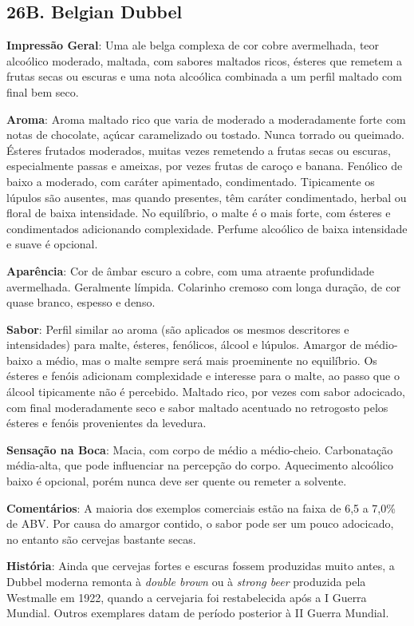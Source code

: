 \subsection*{26B. Belgian Dubbel}
\textbf{Impressão Geral}: Uma ale belga complexa de cor cobre avermelhada, teor alcoólico moderado, maltada, com sabores maltados ricos, ésteres que remetem a frutas secas ou escuras e uma nota alcoólica combinada a um perfil maltado com final bem seco.

\textbf{Aroma}: Aroma maltado rico que varia de moderado a moderadamente forte com notas de chocolate, açúcar caramelizado ou tostado. Nunca torrado ou queimado. Ésteres frutados moderados, muitas vezes remetendo a frutas secas ou escuras, especialmente passas e ameixas, por vezes frutas de caroço e banana. Fenólico de baixo a moderado, com caráter apimentado, condimentado. Tipicamente os lúpulos são ausentes, mas quando presentes, têm caráter condimentado, herbal ou floral de baixa intensidade. No equilíbrio, o malte é o mais forte, com ésteres e condimentados adicionando complexidade. Perfume alcoólico de baixa intensidade e suave é opcional.

\textbf{Aparência}: Cor de âmbar escuro a cobre, com uma atraente profundidade avermelhada. Geralmente límpida. Colarinho cremoso com longa duração, de cor quase branco, espesso e denso.

\textbf{Sabor}: Perfil similar ao aroma (são aplicados os mesmos descritores e intensidades) para malte, ésteres, fenólicos, álcool e lúpulos. Amargor de médio-baixo a médio, mas o malte sempre será mais proeminente no equilíbrio. Os ésteres e fenóis adicionam complexidade e interesse para o malte, ao passo que o álcool tipicamente não é percebido. Maltado rico, por vezes com sabor adocicado, com final moderadamente seco e sabor maltado acentuado no retrogosto pelos ésteres e fenóis provenientes da levedura.

\textbf{Sensação na Boca}: Macia, com corpo de médio a médio-cheio. Carbonatação média-alta, que pode influenciar na percepção do corpo. Aquecimento alcoólico baixo é opcional, porém nunca deve ser quente ou remeter a solvente.

\textbf{Comentários}: A maioria dos exemplos comerciais estão na faixa de 6,5 a 7,0\% de ABV. Por causa do amargor contido, o sabor pode ser um pouco adocicado, no entanto são cervejas bastante secas.

\textbf{História}: Ainda que cervejas fortes e escuras fossem produzidas muito antes, a Dubbel moderna remonta à \textit{double brown} ou à \textit{strong beer} produzida pela Westmalle em 1922, quando a cervejaria foi restabelecida após a I Guerra Mundial. Outros exemplares datam de período posterior à II Guerra Mundial.

